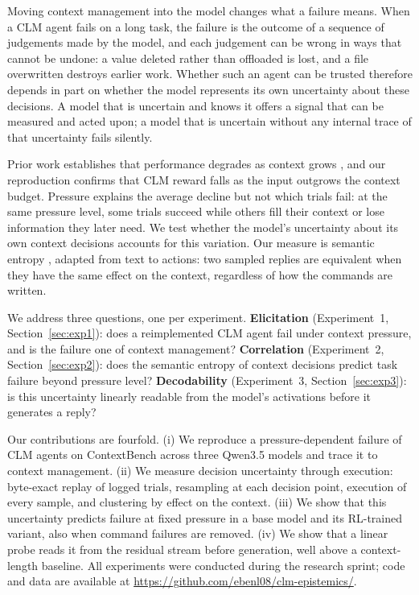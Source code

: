 \documentclass{article}
\begin{document}
Moving context management into the model changes what a failure means.
When a CLM agent fails on a long task, the failure is the outcome of a sequence of judgements made by the model, and each judgement can be wrong in ways that cannot be undone: a value deleted rather than offloaded is lost, and a file overwritten destroys earlier work.
Whether such an agent can be trusted therefore depends in part on whether the model represents its own uncertainty about these decisions.
A model that is uncertain and knows it offers a signal that can be measured and acted upon; a model that is uncertain without any internal trace of that uncertainty fails silently.

Prior work establishes that performance degrades as context grows \citep{du2025context}, and our reproduction confirms that CLM reward falls as the input outgrows the context budget.
Pressure explains the average decline but not which trials fail: at the same pressure level, some trials succeed while others fill their context or lose information they later need.
We test whether the model's uncertainty about its own context decisions accounts for this variation.
Our measure is semantic entropy \citep{kuhn2023semantic,farquhar2024detecting}, adapted from text to actions: two sampled replies are equivalent when they have the same effect on the context, regardless of how the commands are written.

We address three questions, one per experiment.
\textbf{Elicitation} (Experiment~1, Section~\ref{sec:exp1}): does a reimplemented CLM agent fail under context pressure, and is the failure one of context management?
\textbf{Correlation} (Experiment~2, Section~\ref{sec:exp2}): does the semantic entropy of context decisions predict task failure beyond pressure level?
\textbf{Decodability} (Experiment~3, Section~\ref{sec:exp3}): is this uncertainty linearly readable from the model's activations before it generates a reply?

Our contributions are fourfold.
(i) We reproduce a pressure-dependent failure of CLM agents on ContextBench across three Qwen3.5 models and trace it to context management.
(ii) We measure decision uncertainty through execution: byte-exact replay of logged trials, resampling at each decision point, execution of every sample, and clustering by effect on the context.
(iii) We show that this uncertainty predicts failure at fixed pressure in a base model and its RL-trained variant, also when command failures are removed.
(iv) We show that a linear probe reads it from the residual stream before generation, well above a context-length baseline.
All experiments were conducted during the research sprint; code and data are available at \url{https://github.com/ebenl08/clm-epistemics/}.
\end{document}
